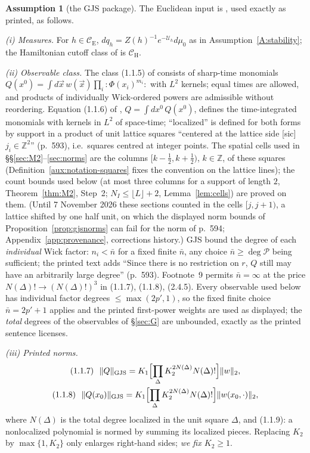 \documentclass[11pt,a4paper]{article}
\theoremstyle{plain}
\theoremstyle{definition}
\newtheorem{assumption}{Assumption}
\theoremstyle{plain}
\theoremstyle{definition}
\newcommand{\Z}{\mathbb{Z}}
\newcommand{\CE}{\mathcal{C}_{\mathrm E}}
\newcommand{\CH}{\mathcal{C}_{\mathrm H}}
\begin{document}
\begin{assumption}[the GJS package]\label{A:gjs}
The Euclidean input is \cite{GJS}, used exactly as printed, as follows.

\emph{(i) Measures.} For $h\in\CE$, $dq_h=Z(h)^{-1}e^{-\mathcal U_h}d\mu_0$ as in
Assumption~\ref{A:stability}; the Hamiltonian cutoff class of \cite[(1.6), p.~588]{GJS} is
$\CH$.

\emph{(ii) Observable class.} The class (1.1.5) of \cite{GJS} consists of sharp-time monomials
$Q(x^0)=\int d\vec x\,w(\vec x)\prod_i{:}\Phi(x_i)^{m_i}{:}$ with $L^2$ kernels; equal times
are allowed, and products of individually Wick-ordered powers are admissible without
reordering.  Equation (1.1.6) of \cite{GJS}, $Q=\int dx^0\,Q(x^0)$, defines the
time-integrated monomials with kernels in $L^2$ of space-time; ``localized'' is defined for
both forms by support in a product of unit lattice squares ``centered at the lattice side
[sic] $j_i\in\mathbb Z^2$'' (p.~593), i.e.\ squares centred at integer points.  The spatial
cells used in \S\S\ref{sec:M2}--\ref{sec:norms} are the columns $[k-\frac12,k+\frac12)$,
$k\in\Z$, of these squares (Definition~\ref{aux:notation-squares} fixes the convention on
the lattice lines); the count bounds used below (at most three columns for a support of
length $2$, Theorem~\ref{thm:M2}, Step~2; $N_I\le\lfloor L\rfloor+2$,
Lemma~\ref{lem:cells}) are proved on them.  (Until 7 November 2026 these sections counted
in the cells $[j,j+1)$, a lattice shifted by one half unit, on which the displayed norm bounds
of Proposition~\ref{prop:gjsnorms} can fail for the norm of p.~594; Appendix~\ref{app:provenance},
corrections history.) GJS bound the degree of each \emph{individual} Wick factor: $n_i<\bar n$ for a fixed
finite $\bar n$, any choice $\bar n\ge\deg\mathscr P$ being sufficient; the printed text
adds ``Since there is no restriction on $r$, $Q$ still may have an arbitrarily large
degree'' (p.~593). Footnote~9 permits $\bar n=\infty$ at the price
$N(\Delta)!\to(N(\Delta)!)^3$ in (1.1.7), (1.1.8), (2.4.5). Every observable used below
has individual factor degrees $\le\max(2p',1)$, so the fixed finite choice
$\bar n=2p'+1$ applies and the printed first-power weights are used as displayed; the
\emph{total} degrees of the observables of \S\ref{sec:G} are unbounded, exactly as the
printed sentence licenses.

\emph{(iii) Printed norms.}
\begin{equation}
\begin{gathered}
 \textup{(1.1.7)}\ \ \|Q\|_{\rm GJS}=K_1\Bigl[\prod_\Delta K_2^{2N(\Delta)}N(\Delta)!\Bigr]\|w\|_2,\\
 \textup{(1.1.8)}\ \ \|Q(x_0)\|_{\rm GJS}=K_1\Bigl[\prod_\Delta K_2^{2N(\Delta)}N(\Delta)!\Bigr]\|w(x_0,\cdot)\|_2,
\end{gathered}
 \label{eq:printednorm}
\end{equation}
where $N(\Delta)$ is the total degree localized in the unit square $\Delta$, and
\textup{(1.1.9)}: a nonlocalized polynomial is normed by summing its localized pieces.
Replacing $K_2$ by $\max\{1,K_2\}$ only enlarges right-hand sides; \emph{we fix $K_2\ge1$}.


\end{assumption}
\end{document}
